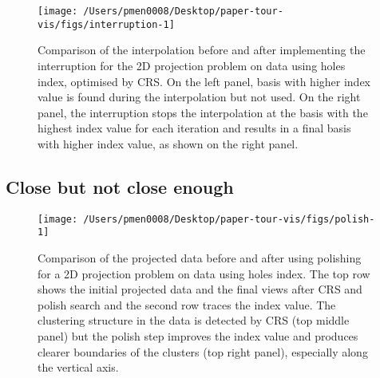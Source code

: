 \begin{Schunk}
\begin{figure}

{\centering \texttt{[image: /Users/pmen0008/Desktop/paper-tour-vis/figs/interruption-1]} 

}

\caption[Comparison of the interpolation before and after implementing the interruption for the 2D projection problem on  data using holes index, optimised by CRS]{Comparison of the interpolation before and after implementing the interruption for the 2D projection problem on  data using holes index, optimised by CRS. On the left panel, basis with higher index value is found during the interpolation but not used. On the right panel, the interruption stops the interpolation at the basis with the highest index value for each iteration and results in a final basis with higher index value, as shown on the right panel.}\label{fig:interruption}
\end{figure}
\end{Schunk}

\hypertarget{close-but-not-close-enough}{%
\subsection{Close but not close
enough}\label{close-but-not-close-enough}}

\begin{Schunk}
\begin{figure}

{\centering \texttt{[image: /Users/pmen0008/Desktop/paper-tour-vis/figs/polish-1]} 

}

\caption[Comparison of the projected data before and after using polishing for a 2D projection problem on  data using holes index]{Comparison of the projected data before and after using polishing for a 2D projection problem on  data using holes index. The top row shows the initial projected data and the final views after CRS and polish search and the second row traces the index value. The clustering structure in the data is detected by CRS (top middle panel) but the polish step improves the index value and produces clearer boundaries of the clusters (top right panel), especially along the vertical axis.}\label{fig:polish}
\end{figure}
\end{Schunk}

